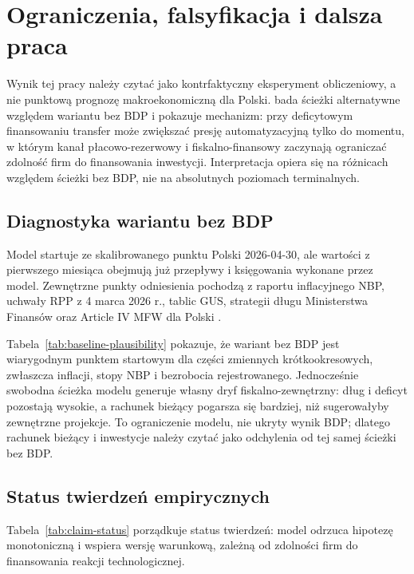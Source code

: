 \section{Ograniczenia, falsyfikacja i dalsza praca}

Wynik tej pracy należy czytać jako kontrfaktyczny eksperyment obliczeniowy, a nie punktową prognozę makroekonomiczną dla Polski. \amor{} bada ścieżki alternatywne względem wariantu bez BDP i pokazuje mechanizm: przy deficytowym finansowaniu transfer może zwiększać presję automatyzacyjną tylko do momentu, w którym kanał płacowo-rezerwowy i fiskalno-finansowy zaczynają ograniczać zdolność firm do finansowania inwestycji. Interpretacja opiera się na różnicach względem ścieżki bez BDP, nie na absolutnych poziomach terminalnych.

\subsection{Diagnostyka wariantu bez BDP}

Model startuje ze skalibrowanego punktu Polski 2026-04-30, ale wartości z pierwszego miesiąca obejmują już przepływy i księgowania wykonane przez model. Zewnętrzne punkty odniesienia pochodzą z raportu inflacyjnego NBP, uchwały RPP z 4 marca 2026 r., tablic GUS, strategii długu Ministerstwa Finansów oraz Article IV MFW dla Polski \parencite{nbp2026inflationReport,nbp2026rppResolution,gus2026unemploymentMarch,gus2026gdp2025Preliminary,mf2025debtStrategy,imf2026polandArticleIV}.



Tabela~\ref{tab:baseline-plausibility} pokazuje, że wariant bez BDP jest wiarygodnym punktem startowym dla części zmiennych krótkookresowych, zwłaszcza inflacji, stopy NBP i bezrobocia rejestrowanego. Jednocześnie swobodna ścieżka modelu generuje własny dryf fiskalno-zewnętrzny: dług i deficyt pozostają wysokie, a rachunek bieżący pogarsza się bardziej, niż sugerowałyby zewnętrzne projekcje. To ograniczenie modelu, nie ukryty wynik BDP; dlatego rachunek bieżący i inwestycje należy czytać jako odchylenia od tej samej ścieżki bez BDP.

\subsection{Status twierdzeń empirycznych}

Tabela~\ref{tab:claim-status} porządkuje status twierdzeń: model odrzuca hipotezę monotoniczną i wspiera wersję warunkową, zależną od zdolności firm do finansowania reakcji technologicznej.

